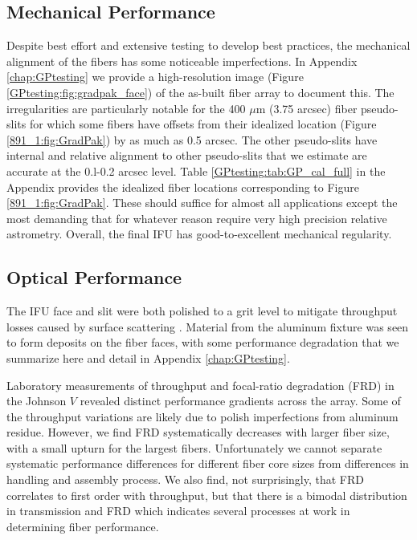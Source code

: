 \subsection{Mechanical Performance}

Despite best effort and extensive testing to develop best practices,
the mechanical alignment of the \GP fibers has some noticeable
imperfections. In Appendix \ref{chap:GPtesting} we provide a
high-resolution image (Figure \ref{GPtesting:fig:gradpak_face}) of the
as-built fiber array to document this. The irregularities are
particularly notable for the 400 $\mu$m (3.75 arcsec) fiber
pseudo-slits for which some fibers have offsets from their idealized
location (Figure \ref{891_1:fig:GradPak}) by as much as 0.5
arcsec. The other pseudo-slits have internal and relative alignment to
other pseudo-slits that we estimate are accurate at the 0.l-0.2 arcsec
level. Table \ref{GPtesting:tab:GP_cal_full} in the Appendix provides
the idealized fiber locations corresponding to Figure
\ref{891_1:fig:GradPak}. These should suffice for almost all
applications except the most demanding that for whatever reason
require very high precision relative astrometry. Overall, the final
IFU has good-to-excellent mechanical regularity.

\subsection{Optical Performance}

\label{891_1:sec:gradpak_performance}

The IFU face and slit were both polished to a  grit
level to mitigate throughput losses caused by surface scattering
\citep{Eigenbrot12}. Material from the aluminum fixture was seen to
form deposits on the fiber faces, with some performance degradation
that we summarize here and detail in Appendix \ref{chap:GPtesting}.

Laboratory measurements of throughput and focal-ratio degradation
(FRD) in the Johnson $V$ revealed distinct performance gradients
across the array. Some of the throughput variations are likely due to
polish imperfections from aluminum residue. However, we find FRD
systematically decreases with larger fiber size, with a small upturn
for the largest fibers. Unfortunately we cannot separate systematic
performance differences for different fiber core sizes from
differences in handling and assembly process. We also find, not
surprisingly, that FRD correlates to first order with throughput, but
that there is a bimodal distribution in transmission and FRD which
indicates several processes at work in determining fiber performance.

